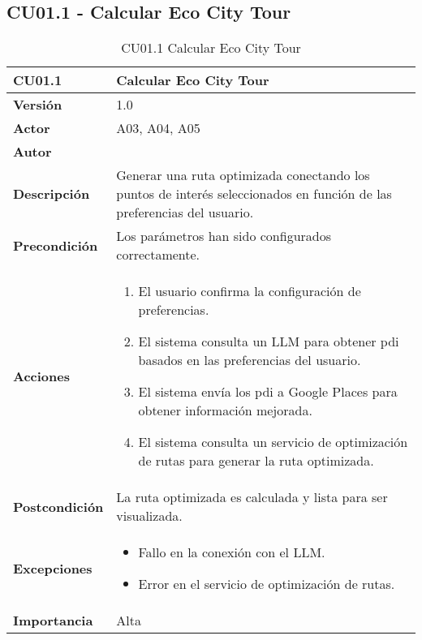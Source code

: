 \subsection{CU01.1 - Calcular Eco City Tour}
\begin{table}[p]
	\centering
	\begin{tabularx}{\linewidth}{ p{} p{} }
		\toprule
		\textbf{CU01.1}    & \textbf{Calcular Eco City Tour} \\
		\toprule
		\textbf{Versión}              & 1.0    \\
		\textbf{Actor}                & A03, A04, A05 \\
		\textbf{Autor}                & \autor \\
		\textbf{Descripción}          & Generar una ruta optimizada conectando los puntos de interés seleccionados en función de las preferencias del usuario. \\
		\textbf{Precondición}         & Los parámetros han sido configurados correctamente. \\
		\textbf{Acciones}             &
		\begin{enumerate}
			\def\labelenumi{\arabic{enumi}.}
			\tightlist
			\item El usuario confirma la configuración de preferencias.
			\item El sistema consulta un LLM para obtener \acrshort{pdi} basados en las preferencias del usuario.
			\item El sistema envía los \acrshort{pdi} a Google Places para obtener información mejorada.
			\item El sistema consulta un servicio de optimización de rutas para generar la ruta optimizada.
		\end{enumerate}\\
		\textbf{Postcondición}        & La ruta optimizada es calculada y lista para ser visualizada. \\
		\textbf{Excepciones}          & 
		\begin{itemize}
			\tightlist
			\item Fallo en la conexión con el LLM.
			\item Error en el servicio de optimización de rutas.
		\end{itemize}\\
		\textbf{Importancia}          & Alta \\
		\bottomrule
	\end{tabularx}
	\caption{CU01.1 Calcular Eco City Tour}
\end{table}

